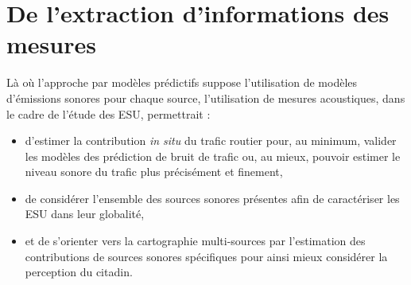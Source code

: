 \section{De l'extraction d'informations des mesures}

Là où l'approche par modèles prédictifs suppose l'utilisation de modèles d'émissions sonores pour chaque source, l'utilisation de mesures acoustiques, dans le cadre de l'étude des ESU, permettrait : 

\begin{itemize}
\item d'estimer la contribution \textit{in situ} du trafic routier pour, au minimum, valider les modèles des prédiction de bruit de trafic ou, au mieux, pouvoir estimer le niveau sonore du trafic plus précisément et finement,
\item de considérer l'ensemble des sources sonores présentes afin de caractériser les ESU dans leur globalité,
\item et de s'orienter vers la cartographie multi-sources par l'estimation des contributions de sources sonores spécifiques pour ainsi mieux considérer la perception du citadin.\\
\end{itemize}

